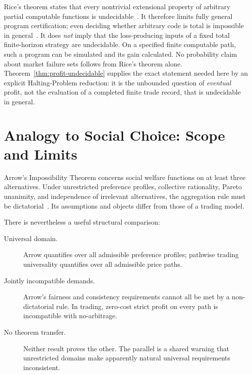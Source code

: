 \documentclass[aps,pra,reprint,superscriptaddress,amsmath,amssymb,floatfix]{revtex4-2}
\theoremstyle{plain}
\theoremstyle{definition}
\theoremstyle{remark}
\begin{document}
Rice's theorem states that every nontrivial extensional property of arbitrary
partial computable functions is undecidable~\cite{Rice-1953}. It therefore
limits fully general program certification; even deciding whether arbitrary
code is total is impossible in general~\cite{turing-36}. It does \emph{not}
imply that the loss-producing inputs of a fixed total finite-horizon strategy
are undecidable. On a specified finite computable path, such a program can be
simulated and its gain calculated. No probability claim about market failure
sets follows from Rice's theorem alone. Theorem~\ref{thm:profit-undecidable}
supplies the exact statement needed here by an explicit Halting-Problem
reduction: it is the unbounded question of \emph{eventual} profit, not the
evaluation of a completed finite trade record, that is undecidable in general.

\section{Analogy to Social Choice: Scope and Limits}
\label{sec:arrow}

Arrow's Impossibility Theorem concerns social welfare functions on at least
three alternatives. Under unrestricted preference profiles, collective
rationality, Pareto unanimity, and independence of irrelevant alternatives,
the aggregation rule must be dictatorial~\cite{Arrow1963}. Its assumptions and
objects differ from those of a trading model.

There is nevertheless a useful structural comparison:
\begin{description}
  \item[Universal domain.] Arrow quantifies over all admissible preference
  profiles; pathwise trading universality quantifies over all admissible price
  paths.
  \item[Jointly incompatible demands.] Arrow's fairness and consistency
  requirements cannot all be met by a non-dictatorial rule. In trading,
  zero-cost strict profit on every path is incompatible with no-arbitrage.
  \item[No theorem transfer.] Neither result proves the other. The parallel is
  a shared warning that unrestricted domains make apparently natural
  universal requirements inconsistent.
\end{description}
\end{document}
